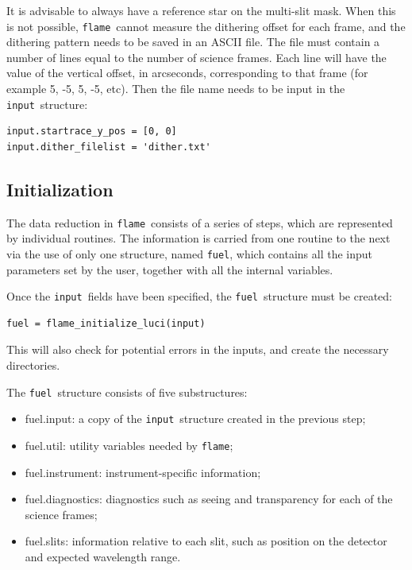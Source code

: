 \documentclass[a4paper, notitlepage]{article}
\newcommand{\flame}{\texttt{flame}}
\newcommand{\fuel}{\texttt{fuel}}
\newcommand{\inp}{\texttt{input}}
\begin{document}
It is advisable to always have a reference star on the multi-slit mask. When this is not possible, \flame\ cannot measure the dithering offset for each frame, and the dithering pattern needs to be saved in an ASCII file. The file must contain a number of lines equal to the number of science frames. Each line will have the value of the vertical offset, in arcseconds, corresponding to that frame (for example 5, -5, 5, -5, etc). Then the file name needs to be input in the \inp\ structure:
\begin{lstlisting}
input.startrace_y_pos = [0, 0]
input.dither_filelist = 'dither.txt'
\end{lstlisting}






\subsection{Initialization}

The data reduction in \flame\ consists of a series of steps, which are represented by individual routines. The information is carried from one routine to the next via the use of only one structure, named \fuel, which contains all the input parameters set by the user, together with all the internal variables.

Once the \inp\ fields have been specified, the \fuel\ structure must be created:
\begin{lstlisting}
fuel = flame_initialize_luci(input)
\end{lstlisting}
This will also check for potential errors in the inputs, and create the necessary directories.

The \fuel\ structure consists of five substructures:
\begin{itemize}
	\item fuel.input: a copy of the \inp\ structure created in the previous step;
	\item fuel.util: utility variables needed by \flame;
	\item fuel.instrument: instrument-specific information;
	\item fuel.diagnostics: diagnostics such as seeing and transparency for each of the science frames;
	\item fuel.slits: information relative to each slit, such as position on the detector and expected wavelength range.
\end{itemize}
\end{document}

